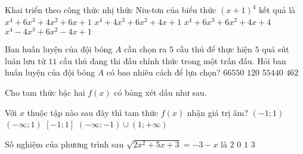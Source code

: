 \begin{ex}%
Khai triển theo công thức nhị thức Niu-tơn của biểu thức $(x+1)^4$ kết quả là 
\choice
{$x^4+6x^3+4x^2+6x+1$}
{\True $x^4+4x^3+6x^2+4x+1$}
{$x^4+6x^3+6x^2+4x+4$}
{$x^4-4x^3+6x^2-4x+1$}
\end{ex}
\begin{ex}%
Ban huấn luyện của đội bóng $A$ cần chọn ra $5$ cầu thủ để thực hiện $5$ quả sút luân lưu từ $11$ cầu thủ đang thi đấu chính thức trong một trấn đấu. Hỏi ban huấn luyện của đội bóng $A$ có bao nhiêu cách để lựa chọn? 
\choice
{$66550$}
{$120$}
{\True $55440$}
{$462$}
\end{ex}
\begin{ex}%
Cho tam thức bậc hai $f(x)$ có bảng xét dấu như sau. 
\begin{center}
\end{center}
Với $x$ thuộc tập nào sau đây thì tam thức $f(x)$ nhận giá trị âm?  
\choice
{\True $(-1;1)$}
{$(-\infty;1)$}
{$[-1;1]$}
{$(-\infty;-1) \cup(1;+\infty)$}
\end{ex}
\begin{ex}%
Số nghiệm của phương trình sau $\sqrt{2x^2+5x+3}=-3-x$ là 
\choice
{$2$}
{\True $0$}
{$1$}
{$3$}
\end{ex}
